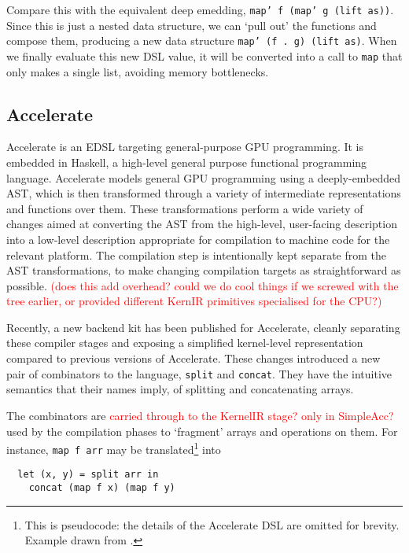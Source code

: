 \documentclass[a4paper,12pt]{article}
\newcommand{\red}[1]{\textcolor{red}{#1}}
\newcommand{\icf}[1]{\mbox{\texttt{#1}}} %
\begin{document}
Compare this with the equivalent deep emedding, \icf{map'\ f\ (map'\ g\ (lift\ as))}. 
Since this is just a nested data structure, we can `pull out' the functions and compose them, producing a new data structure \icf{map'\ (f\ .\ g)\ (lift\ as)}.
When we finally evaluate this new DSL value, it will be converted into a call to \icf{map} that only makes a single list, avoiding memory bottlenecks.

\subsection{Accelerate}

Accelerate is an EDSL targeting general-purpose GPU programming. 
It is embedded in Haskell, a high-level general purpose functional programming language.
Accelerate models general GPU programming using a deeply-embedded AST, which is then transformed through a variety of intermediate representations and functions over them.
These transformations perform a wide variety of changes aimed at converting the AST from the high-level, user-facing description into a low-level description appropriate for compilation to machine code for the relevant platform.
The compilation step is intentionally kept separate from the AST transformations, to make changing compilation targets as straightforward as possible.
\red{(does this add overhead? could we do cool things if we screwed with the tree earlier, or provided different KernIR primitives specialised for the CPU?)}

Recently, a new backend kit has been published for Accelerate, cleanly separating these compiler stages and exposing a simplified kernel-level representation compared to previous versions of Accelerate.
These changes introduced a new pair of combinators to the language, \icf{split} and \icf{concat}.
They have the intuitive semantics that their names imply, of splitting and concatenating arrays.

The combinators are \red{carried through to the KernelIR stage? only in SimpleAcc?} used by the compilation phases to `fragment' arrays and operations on them.
For instance, \icf{map\ f\ arr} may be translated\footnote{This is pseudocode: the details of the Accelerate DSL are omitted for brevity. Example drawn from \citet{newton_converting_2014}.} into

\begin{verbatim}
  let (x, y) = split arr in
    concat (map f x) (map f y)
\end{verbatim}
\end{document}
